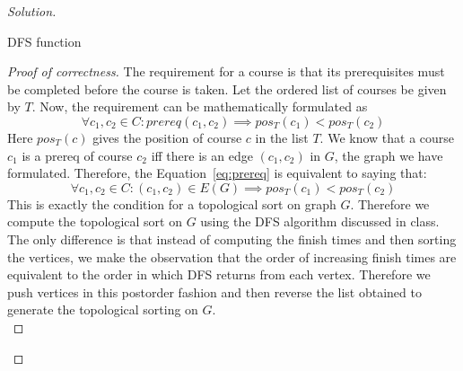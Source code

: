 \begin{solution}{2.1}
\begin{proof}[Solution]
        \begin{algorithm}[H]
            \caption{DFS function}
            \begin{algorithmic}
                     
                     
                    \State{\Return{}}
                    \EndIf{}
                \EndFor{}
                 
                 
            \EndProcedure{}
            \end{algorithmic}
        \end{algorithm}
        \begin{proof}[Proof of correctness]
            The requirement for a course is that its prerequisites must be completed before the course is taken. Let the ordered list of courses be given by $T$. Now, the requirement can be mathematically formulated as
            \begin{equation}\label{eq:prereq}
                \forall c_1, c_2\in C: prereq(c_1, c_2)\implies pos_T(c_1) < pos_T(c_2)
            \end{equation}
            Here $pos_T(c)$ gives the position of course $c$ in the list $T$. We know that a course $c_1$ is a prereq of course $c_2$ iff there is an edge $(c_1, c_2)$ in $G$, the graph we have formulated. Therefore, the Equation~\ref{eq:prereq} is equivalent to saying that:
            \begin{equation}\label{eq:topo}
                \forall c_1, c_2\in C: (c_1, c_2)\in E(G)\implies pos_T(c_1) < pos_T(c_2)
            \end{equation}
            This is exactly the condition for a topological sort on graph $G$. Therefore we compute the topological sort on $G$ using the DFS algorithm discussed in class. The only difference is that instead of computing the finish times and then sorting the vertices, we make the observation that the order of increasing finish times are equivalent to the order in which DFS returns from each vertex. Therefore we push vertices in this postorder fashion and then reverse the list obtained to
            generate the topological sorting on $G$.\\

\end{proof}
\end{proof}
\end{solution}
